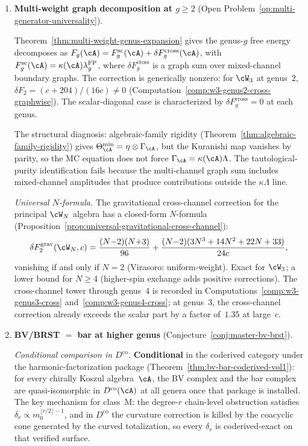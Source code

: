 \begin{enumerate}[label=\textup{(\arabic*)}]

\item \textbf{Multi-weight graph decomposition at $g \geq 2$}
 (Open Problem~\ref{op:multi-generator-universality}).

Theorem~\ref{thm:multi-weight-genus-expansion} gives
the genus-$g$ free energy decomposes as
$F_g(\cA)=F_g^{\mathrm{sc}}(\cA)
+\delta F_g^{\mathrm{cross}}(\cA)$, with
$F_g^{\mathrm{sc}}(\cA)=\kappa(\cA)\lambda_g^{\mathrm{FP}}$,
where $\delta F_g^{\mathrm{cross}}$ is a graph sum over
 mixed-channel boundary graphs. The correction is generically
 nonzero: for $\cW_3$ at genus~$2$,
 $\delta F_2 = (c{+}204)/(16c) \neq 0$
 (Computation~\ref{comp:w3-genus2-cross-graphwise}).
 The scalar-diagonal case is characterized by
 $\delta F_g^{\mathrm{cross}}=0$ at each genus.

 The structural diagnosis: algebraic-family rigidity
 (Theorem~\ref{thm:algebraic-family-rigidity}) gives
 $\Theta_\cA^{\min} = \eta \otimes \Gamma_\cA$, but the
 Kuranishi map vanishes by parity, so the MC equation does
 not force $\Gamma_\cA = \kappa(\cA)\Lambda$. The
 tautological-purity identification fails because the
 multi-channel graph sum includes mixed-channel amplitudes
 that produce contributions outside the $\kappa\Lambda$ line.

 \smallskip\noindent
 \emph{Universal $N$-formula.}
 The gravitational cross-channel correction for the
 principal $\cW_N$ algebra has a closed-form
 $N$-formula
 (Proposition~\ref{prop:universal-gravitational-cross-channel}):
 \[
 \delta F_2^{\mathrm{grav}}(\cW_N, c)
 = \frac{(N{-}2)(N{+}3)}{96}
 + \frac{(N{-}2)(3N^3 + 14N^2 + 22N + 33)}{24c},
 \]
 vanishing if and only if $N = 2$ (Virasoro: uniform-weight).
 Exact for $\cW_3$; a lower bound for $N \geq 4$
 (higher-spin exchange adds positive corrections).
 The cross-channel tower through genus~$4$ is recorded in
 Computations~\ref{comp:w3-genus3-cross}
 and~\ref{comp:w3-genus4-cross}; at genus~$3$,
 the cross-channel correction already exceeds the scalar
 part by a factor of~$1.35$ at large~$c$.

\item \textbf{BV/BRST $=$ bar at higher genus}
 (Conjecture~\ref{conj:master-bv-brst}).

 \smallskip\noindent
 \emph{Conditional comparison in $D^{\mathrm{co}}$.}
 \textbf{Conditional} in the coderived category under the
 harmonic-factorization package
 (Theorem~\ref{thm:bv-bar-coderived-vol1}):
 for every chirally Koszul algebra~$\cA$, the BV complex and the
 bar complex are quasi-isomorphic in $D^{\mathrm{co}}(\cA)$ at
 all genera once that package is installed. The key mechanism for class~M:
 the degree-$r$
 chain-level obstruction satisfies
 $\delta_r \propto m_0^{\lfloor r/2 \rfloor - 1}$, and in
 $D^{\mathrm{co}}$ the curvature correction is killed by the
 coacyclic cone generated by the curved totalization, so every
 $\delta_r$ is coderived-exact on that verified surface.


\end{enumerate}
